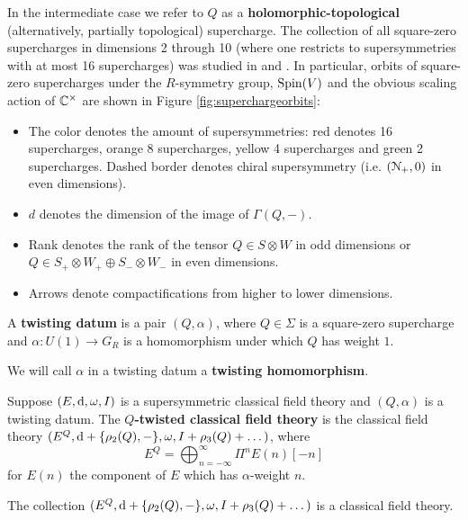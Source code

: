 \documentclass[10pt, oneside]{article}
\begin{document}
In the intermediate case we refer to $Q$ as a {\bf holomorphic-topological} (alternatively, partially topological) supercharge. The collection of all square-zero supercharges in dimensions 2 through 10 (where one restricts to supersymmetries with at most 16 supercharges) was studied in \cite{ElliottSafronov} and \cite{EagerSaberiWalcher}. In particular, orbits of square-zero supercharges under the $R$-symmetry group, $\mathrm{Spin}(V)$ and the obvious scaling action of $\mathbb C^\times$ are shown in Figure \ref{fig:superchargeorbits}:
\begin{itemize}
\item The color denotes the amount of supersymmetries: red denotes 16 supercharges, orange 8 supercharges, yellow 4 supercharges and green 2 supercharges. Dashed border denotes chiral supersymmetry (i.e. $(\mathcal N_+, 0)$ in even dimensions).

\item $d$ denotes the dimension of the image of $\Gamma(Q, -)$.

\item Rank denotes the rank of the tensor $Q\in S\otimes W$ in odd dimensions or $Q\in S_+\otimes W_+\oplus S_-\otimes W_-$ in even dimensions.

\item Arrows denote compactifications from higher to lower dimensions.
\end{itemize}

\begin{dfn}
A {\bf twisting datum} is a pair $(Q, \alpha)$, where $Q\in\Sigma$ is a square-zero supercharge and $\alpha\colon U(1)\rightarrow G_R$ is a homomorphism under which $Q$ has weight $1$.
\end{dfn}

We will call $\alpha$ in a twisting datum a {\bf twisting homomorphism}.

\begin{dfn}
Suppose $(E, {\rm d}, \omega, I)$ is a supersymmetric classical field theory and $(Q, \alpha)$ is a twisting datum. The {\bf $Q$-twisted classical field theory} is the classical field theory $(E^Q, {\rm d} + \{\rho_2(Q), -\}, \omega, I + \rho_3(Q) + \dots)$, where
\[E^Q = \bigoplus_{n=-\infty}^\infty \Pi^n E(n)[-n]\]
for $E(n)$ the component of $E$ which has $\alpha$-weight $n$.
\end{dfn}

\begin{prop}
The collection $(E^Q, {\rm d} + \{\rho_2(Q), -\}, \omega, I + \rho_3(Q) + \dots)$ is a classical field theory.
\end{prop}
\end{document}
